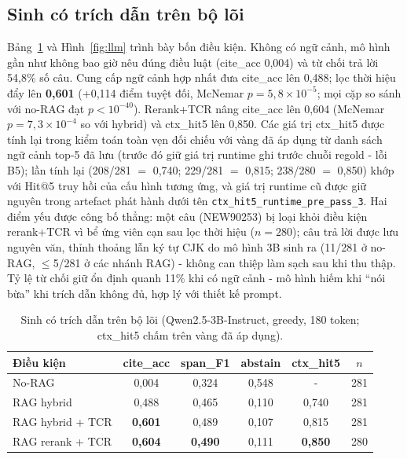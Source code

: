 \documentclass[11pt,a4paper]{article}
\begin{document}
\subsection{Sinh có trích dẫn trên bộ lõi}

Bảng~\ref{tab:core-llm} và Hình~\ref{fig:llm} trình bày bốn điều kiện. Không có ngữ cảnh, mô hình gần như không bao giờ nêu đúng điều luật (cite\_acc 0,004) và từ chối trả lời 54,8\% số câu. Cung cấp ngữ cảnh hợp nhất đưa cite\_acc lên 0,488; lọc thời hiệu đẩy lên \textbf{0,601} (+0,114 điểm tuyệt đối, McNemar $p=5{,}8\times10^{-5}$; mọi cặp so sánh với no-RAG đạt $p<10^{-40}$). Rerank+TCR nâng cite\_acc lên 0,604 (McNemar $p=7{,}3\times10^{-4}$ so với hybrid) và ctx\_hit5 lên 0,850. Các giá trị ctx\_hit5 được tính lại trong kiểm toán toàn vẹn đối chiếu với vàng đã áp dụng từ danh sách ngữ cảnh top-5 đã lưu (trước đó giữ giá trị runtime ghi trước chuỗi regold - lỗi B5); lần tính lại (208/281 $=$ 0,740; 229/281 $=$ 0,815; 238/280 $=$ 0,850) khớp với Hit@5 truy hồi của cấu hình tương ứng, và giá trị runtime cũ được giữ nguyên trong artefact phát hành dưới tên \texttt{ctx\_hit5\_runtime\_pre\_pass\_3}. Hai điểm yếu được công bố thẳng: một câu (NEW90253) bị loại khỏi điều kiện rerank+TCR vì bể ứng viên cạn sau lọc thời hiệu ($n{=}280$); câu trả lời được lưu nguyên văn, thỉnh thoảng lẫn ký tự CJK do mô hình 3B sinh ra (11/281 ở no-RAG, $\le$5/281 ở các nhánh RAG) - không can thiệp làm sạch sau khi thu thập. Tỷ lệ từ chối giữ ổn định quanh 11\% khi có ngữ cảnh - mô hình hiếm khi ``nói bừa'' khi trích dẫn không đủ, hợp lý với thiết kế prompt.

\begin{table}[t]
\centering\small
\caption{Sinh có trích dẫn trên bộ lõi (Qwen2.5-3B-Instruct, greedy, 180 token; ctx\_hit5 chấm trên vàng đã áp dụng).}
\label{tab:core-llm}
\begin{tabular}{lccccc}
\toprule
Điều kiện & cite\_acc & span\_F1 & abstain & ctx\_hit5 & $n$ \\
\midrule
No-RAG & 0,004 & 0,324 & 0,548 & - & 281 \\
RAG hybrid & 0,488 & 0,465 & 0,110 & 0,740 & 281 \\
RAG hybrid + TCR & \textbf{0,601} & 0,489 & 0,107 & 0,815 & 281 \\
RAG rerank + TCR & \textbf{0,604} & \textbf{0,490} & 0,111 & \textbf{0,850} & 280 \\
\bottomrule
\end{tabular}
\end{table}
\end{document}
